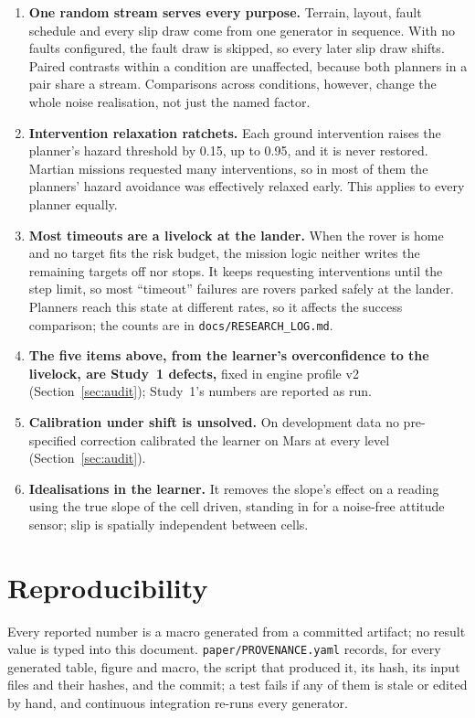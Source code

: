 \documentclass[11pt]{article}
\begin{document}
\begin{enumerate}[leftmargin=2em]
  faults'' condition exposed only \AuditFiredAdaptive{}--\AuditFiredFixed{} of
  missions to any fault. It is not a test of fault tolerance.
  \item \textbf{One random stream serves every purpose.} Terrain, layout, fault
  schedule and every slip draw come from one generator in sequence. With no
  faults configured, the fault draw is skipped, so every later slip draw shifts.
  Paired contrasts within a condition are unaffected, because both planners in a
  pair share a stream. Comparisons across conditions, however, change the whole
  noise realisation, not just the named factor.
  \item \textbf{Intervention relaxation ratchets.} Each ground intervention
  raises the planner's hazard threshold by 0.15, up to 0.95, and it is never
  restored. Martian missions requested many interventions, so in most of them
  the planners' hazard avoidance was effectively relaxed early. This applies to
  every planner equally.
  \item \textbf{Most timeouts are a livelock at the lander.} When the rover is
  home and no target fits the risk budget, the mission logic neither writes the
  remaining targets off nor stops. It keeps requesting interventions until the
  step limit, so most ``timeout'' failures are rovers parked safely at the
  lander. Planners reach this state at different rates, so it affects the
  success comparison; the counts are in \texttt{docs/RESEARCH\_LOG.md}.
  \item \textbf{The five items above, from the learner's overconfidence to the
  livelock, are Study~1 defects,} fixed in engine profile v2
  (Section~\ref{sec:audit}); Study~1's numbers are reported as run.
  \item \textbf{Calibration under shift is unsolved.} On development data no
  pre-specified correction calibrated the learner on Mars at every level
  (Section~\ref{sec:audit}).
  \item \textbf{Idealisations in the learner.} It removes the slope's effect on a
  reading using the true slope of the cell driven, standing in for a
  noise-free attitude sensor; slip is spatially independent between cells.
\end{enumerate}

\section{Reproducibility}
\label{sec:repro}

Every reported number is a macro generated from a committed artifact; no result
value is typed into this document. \texttt{paper/PROVENANCE.yaml} records, for
every generated table, figure and macro, the script that produced it, its hash,
its input files and their hashes, and the commit; a test fails if any of them
is stale or edited by hand, and continuous integration re-runs every
generator.
\end{document}
